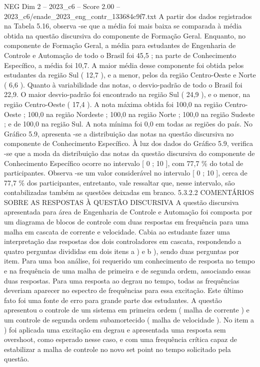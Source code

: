 \begin{textsample}{NEG Dim 2 – 2023\_c6 – Score 2.00 – 2023\_c6/enade\_2023\_eng\_contr\_133684c9f7.txt}
A partir dos dados registrados na Tabela 5.16, observa -se que a média foi mais baixa se comparada à média obtida na questão discursiva do componente de Formação Geral.
Enquanto, no componente de Formação Geral, a média para estudantes de Engenharia de Controle e Automação de todo o Brasil foi 45,5 ; na parte de Conhecimento Específico, a média foi 10,7.
A maior média desse componente foi obtida pelos estudantes da região Sul ( 12,7 ), e a menor, pelos da região Centro-Oeste e Norte ( 6,6 ).
Quanto à variabilidade das notas, o desvio-padrão de todo o Brasil foi 22,9.
O maior desvio-padrão foi encontrado na região Sul ( 24,9 ), e o menor, na região Centro-Oeste ( 17,4 ).
A nota máxima obtida foi 100,0 na região Centro-Oeste ; 100,0 na região Nordeste ; 100,0 na região Norte ; 100,0 na região Sudeste ; e de 100,0 na região Sul.
A nota mínima foi 0,0 em todas as regiões do país.
No Gráfico 5.9, apresenta -se a distribuição das notas na questão discursiva no componente de Conhecimento Específico.
À luz dos dados do Gráfico 5.9, verifica -se que a moda da distribuição das notas da questão discursiva do componente de Conhecimento Específico ocorre no intervalo [ 0 ; 10 ], com 77,7 \% do total de participantes.
Observa -se um valor considerável no intervalo [ 0 ; 10 ], cerca de 77,7 \% dos participantes, entretanto, vale ressaltar que, nesse intervalo, são contabilizadas também as questões deixadas em branco. 5.3.2.2 COMENTÁRIOS SOBRE AS RESPOSTAS À QUESTÃO DISCURSIVA A questão discursiva apresentada para área de Engenharia de Controle e Automação foi composta por um diagrama de blocos de controle com duas respostas em frequência para uma malha em cascata de corrente e velocidade.
Cabia ao estudante fazer uma interpretação das respostas dos dois controladores em cascata, respondendo a quatro perguntas divididas em dois itens a ) e b ), sendo duas perguntas por item.
Para uma boa análise, foi requerido um conhecimento de resposta no tempo e na frequência de uma malha de primeira e de segunda ordem, associando essas duas respostas.
Para uma resposta ao degrau no tempo, todas as frequências deveriam aparecer no espectro de frequências para essa excitação.
Este último fato foi uma fonte de erro para grande parte dos estudantes.
A questão apresentou o controle de um sistema em primeira ordem ( malha de corrente ) e um controle de segunda ordem subamortecido ( malha de velocidade ).
No item a ) foi aplicada uma excitação em degrau e apresentada uma resposta sem overshoot, como esperado nesse caso, e com uma frequência crítica capaz de estabilizar a malha de controle no novo set point no tempo solicitado pela questão.

\end{textsample}
